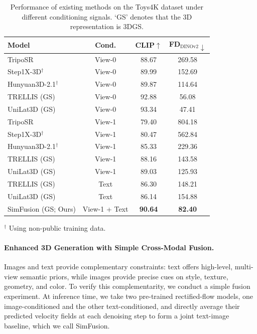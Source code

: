 \begin{table}[t]
\centering
\small
\setlength{\tabcolsep}{4.5pt}
\caption{Performance of existing methods on the Toys4K dataset under different conditioning signals. `GS' denotes that the 3D representation is 3DGS.}
\label{tab:view_0_res}
\begin{tabular}{lccc}
\toprule
\textbf{Model} & \textbf{Cond.} & \textbf{CLIP$\uparrow$} & \textbf{FD$_{\text{DINOv2}}\downarrow$} \\
\midrule
TripoSR                 & View-0 & 88.67 & 269.58 \\
Step1X-3D$^{\dagger}$   & View-0 & 89.99 & 152.69 \\
Hunyuan3D-2.1$^{\dagger}$ & View-0 & 89.87 & 114.64 \\
TRELLIS (GS)               & View-0 & 92.88 & 56.08  \\
UniLat3D (GS)                & View-0 & 93.34 & 47.41 \\
\midrule
TripoSR                 & View-1 & 79.40 & 804.18   \\
Step1X-3D$^{\dagger}$   & View-1 & 80.47 & 562.84    \\
Hunyuan3D-2.1$^{\dagger}$ & View-1 & 85.33 & 229.36   \\
TRELLIS (GS)                  & View-1 & 88.16 & 143.58 \\
UniLat3D (GS)                 & View-1 & 89.03 & 125.93    \\
\midrule
TRELLIS (GS)                  & Text   & 86.30    & 148.21    \\
UniLat3D (GS)                 & Text   & 86.14    & 154.88 \\
\midrule
SimFusion (GS; Ours)        & View-1 + Text & \textbf{90.64} & \textbf{82.40} \\
\bottomrule
\end{tabular}
\vspace{2pt}
\begin{flushleft}
\footnotesize
$^{\dagger}$ Using non-public training data.
\end{flushleft}
\end{table}

\paragraph{Enhanced 3D Generation with Simple Cross-Modal Fusion.}

Images and text provide complementary constraints: text offers high-level, multi-view semantic priors, while images provide precise cues on style, texture, geometry, and color. To verify this complementarity, we conduct a simple fusion experiment. At inference time, we take two pre-trained rectified-flow models, one image-conditioned and the other text-conditioned, and directly average their predicted velocity fields at each denoising step to form a joint text-image baseline, which we call SimFusion.

